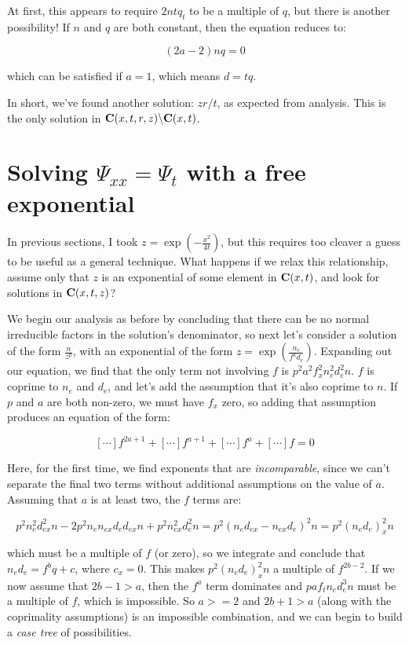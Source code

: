 \documentclass{article}
\newcommand{\C}{\ensuremath{{\bf C}}}
\begin{document}
At first, this appears to require $2ntq_t$ to be a multiple of $q$, but there is another possibility!
If $n$ and $q$ are both constant, then the equation reduces to:

$$(2a-2)nq = 0$$

which can be satisfied if $a=1$, which means $d=tq$.

In short, we've found another solution: $zr/t$, as expected from analysis.
This is the only solution in $\C(x,t,r,z) \backslash \C(x,t)$.

\vfill\eject
\section*{Solving $\Psi_{xx}=\Psi_t$ with a free exponential}

In previous sections, I took $z=\exp(-\frac{x^2}{4t})$, but this
requires too cleaver a guess to be useful as a general technique.
What happens if we relax this relationship, assume only that $z$ is an
exponential of some element in $\C(x,t)$, and look for solutions in
$\C(x,t,z)$?

We begin our analysis as before by concluding that there can be no
normal irreducible factors in the solution's denominator, so next
let's consider a solution of the form $\frac{n}{z^p}$, with an
exponential of the form $z=\exp(\frac{n_e}{f^a d_e})$.  Expanding out
our equation, we find that the only term not involving $f$ is
$p^{2}a^{2}f_x^{2}n_e^{2}d_e^{2}n$.  $f$ is coprime to $n_e$ and $d_e$,
and let's add the assumption that it's also coprime to $n$.  If $p$
and $a$ are both non-zero, we must have $f_x$ zero, so adding that
assumption produces an equation of the form:

$$[\cdots]f^{2a+1} + [\cdots]f^{a+1} + [\cdots]f^a + [\cdots]f = 0$$

Here, for the first time, we find exponents that are {\it incomparable},
since we can't separate the final two terms without additional
assumptions on the value of $a$.  Assuming that $a$ is at least two,
the $f$ terms are:

$$p^{2}n_e^{2}d_{ex}^{2}n -2p^{2}n_en_{ex}d_ed_{ex}n +p^{2}n_{ex}^{2}d_e^{2}n = p^2(n_e d_{ex} - n_{ex} d_e)^2n = p^2(n_e d_e)_x^2n$$

which must be a multiple of $f$ (or zero), so we integrate and
conclude that $n_e d_e = f^b q+c$, where $c_x=0$.  This makes
$p^2(n_e d_e)_x^2n$ a multiple of $f^{2b-2}$.  If we now assume
that $2b-1 > a$, then the $f^a$ term dominates and $paf_tn_ed_e^{3}n$
must be a multiple of $f$, which is impossible.  So $a>=2$ and $2b+1>a$
(along with the coprimality assumptions) is an impossible combination,
and we can begin to build a {\it case tree} of possibilities.
\end{document}
